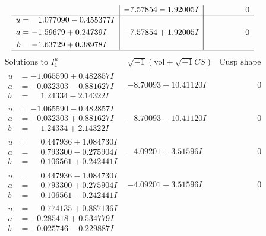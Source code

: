 \documentclass[1p]{elsarticle_modified}
\theoremstyle{definition}
\newcommand{\I}{\sqrt{-1}}
\begin{document}
$$\begin{array}{c|c|c}
 & -7.57854 - 1.92005 I & \phantom{-0.000000 } 0 \\ \hline\begin{aligned}
u &= \phantom{-}1.077090 - 0.455377 I \\
a &= -1.59679 + 0.24739 I \\
b &= -1.63729 + 0.38978 I\end{aligned}
 & -7.57854 + 1.92005 I & \phantom{-0.000000 } 0\\
 \hline 
 \end{array}$$\newpage$$\begin{array}{c|c|c}  
\text{Solutions to }I^u_{1}& \I (\text{vol} + \sqrt{-1}CS) & \text{Cusp shape}\\
 \hline 
\begin{aligned}
u &= -1.065590 + 0.482857 I \\
a &= -0.032303 - 0.881627 I \\
b &= \phantom{-}1.24334 - 2.14322 I\end{aligned}
 & -8.70093 + 10.41120 I & \phantom{-0.000000 } 0 \\ \hline\begin{aligned}
u &= -1.065590 - 0.482857 I \\
a &= -0.032303 + 0.881627 I \\
b &= \phantom{-}1.24334 + 2.14322 I\end{aligned}
 & -8.70093 - 10.41120 I & \phantom{-0.000000 } 0 \\ \hline\begin{aligned}
u &= \phantom{-}0.447936 + 1.084730 I \\
a &= \phantom{-}0.793300 - 0.275904 I \\
b &= \phantom{-}0.106561 + 0.242441 I\end{aligned}
 & -4.09201 + 3.51596 I & \phantom{-0.000000 } 0 \\ \hline\begin{aligned}
u &= \phantom{-}0.447936 - 1.084730 I \\
a &= \phantom{-}0.793300 + 0.275904 I \\
b &= \phantom{-}0.106561 - 0.242441 I\end{aligned}
 & -4.09201 - 3.51596 I & \phantom{-0.000000 } 0 \\ \hline\begin{aligned}
u &= \phantom{-}0.774135 + 0.887136 I \\
a &= -0.285418 + 0.534779 I \\
b &= -0.025746 - 0.229887 I\end{aligned}

\end{array}$$
\end{document}
